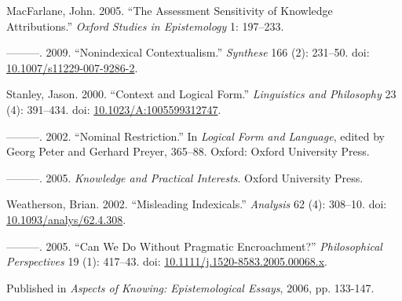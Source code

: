 \documentclass[
  11pt,
  letterpaper,
  DIV=11,
  numbers=noendperiod,
  twoside]{scrartcl}
\newlength{\cslhangindent}
\newenvironment{CSLReferences}[2] %
 {\begin{list}{}{%
  \setlength{\itemindent}{0pt}
  \setlength{\leftmargin}{0pt}
  \setlength{\parsep}{0pt}
  \ifodd #1
   \setlength{\leftmargin}{\cslhangindent}
   \setlength{\itemindent}{-1\cslhangindent}
  \fi
  \setlength{\itemsep}{#2\baselineskip}}}
 {\end{list}}
\begin{document}
\begin{CSLReferences}{1}{0}
MacFarlane, John. 2005. {``The Assessment Sensitivity of Knowledge
Attributions.''} \emph{Oxford Studies in Epistemology} 1: 197--233.

---------. 2009. {``{Nonindexical Contextualism}.''} \emph{Synthese} 166
(2): 231--50. doi:
\href{https://doi.org/10.1007/s11229-007-9286-2}{10.1007/s11229-007-9286-2}.

Stanley, Jason. 2000. {``{Context and Logical Form}.''}
\emph{Linguistics and Philosophy} 23 (4): 391--434. doi:
\href{https://doi.org/10.1023/A:1005599312747}{10.1023/A:1005599312747}.

---------. 2002. {``Nominal Restriction.''} In \emph{Logical Form and
Language}, edited by Georg Peter and Gerhard Preyer, 365--88. Oxford:
Oxford University Press.

---------. 2005. \emph{{Knowledge and Practical Interests}}. Oxford
University Press.

Weatherson, Brian. 2002. {``Misleading Indexicals.''} \emph{Analysis} 62
(4): 308--10. doi:
\href{https://doi.org/10.1093/analys/62.4.308}{10.1093/analys/62.4.308}.

---------. 2005. {``{Can We Do Without Pragmatic Encroachment?}''}
\emph{Philosophical Perspectives} 19 (1): 417--43. doi:
\href{https://doi.org/10.1111/j.1520-8583.2005.00068.x}{10.1111/j.1520-8583.2005.00068.x}.

\end{CSLReferences}



\noindent Published in\emph{
Aspects of Knowing: Epistemological Essays}, 2006, pp. 133-147.
\end{document}
